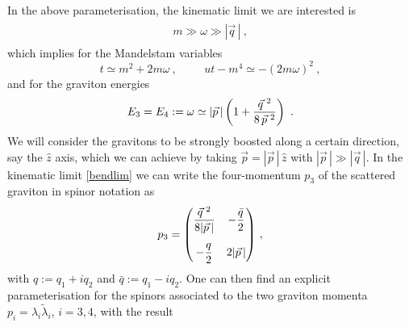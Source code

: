 \documentclass[a4paper,11pt]{article}
\numberwithin{equation}{section}
\begin{document}
In the above  parameterisation, the kinematic limit we are interested  is  
\begin{align}
\begin{split}
\label{bendlim}
m\gg \omega \gg |\vec{q}\, |
\ ,
\end{split}
\end{align}
which implies for the Mandelstam variables
\begin{equation}
t \simeq m^2 + 2m \omega \>, \hspace{1cm} ut - m^4 \simeq - (2 m \omega)^2 \>,
\end{equation}
and for the graviton energies
\begin{align}
\begin{split}
E_3=E_4 := \omega \simeq |\vec{p}\, |\left(1 + {\vec{q}^{\, \, 2} \over 8 \,\vec{p}^{\, \, 2}}\right)
\ .
\end{split}
\end{align}
We will consider the gravitons to be strongly boosted along a certain direction, say the $\hat{z}$ axis, which we can achieve by taking 
$\vec{p} = |\vec{p}\,|\, \hat{z}$ with $|\vec{p}\, |\gg |\vec{q}\, |$.
In the  kinematic limit \eqref{bendlim} we can write the four-momentum $p_3$ of the scattered graviton in spinor notation as 
\begin{align}
\label{spainors}
\begin{split}
p_3 = \begin{pmatrix} 
\dfrac{\vec{q}^{\, \, 2}}{  8  |\vec{p}\, |}  & - \dfrac{\bar{q}}{2}
\vspace{0.3cm} \\ 
- \dfrac{{q}}{2}  & 2  |\vec{p}\, |
\end{pmatrix} \, , 
\end{split}
\end{align}
with $q:= q_1 + i q_2$ and $\bar{q}:= q_1 - i q_2$.  One can then find an explicit parameterisation for the spinors associated to the two graviton momenta  $p_i=\lambda_i \tilde{\lambda}_i$, $i=3,4$, with 
the result 
\end{document}
